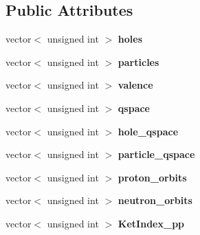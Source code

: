 \subsection*{Public Attributes}
\begin{DoxyCompactItemize}
\item 
\hypertarget{classModelSpace_a7fc062a55dd3c797742492ce81e32570}{vector$<$ unsigned int $>$ {\bfseries holes}}\label{classModelSpace_a7fc062a55dd3c797742492ce81e32570}

\item 
\hypertarget{classModelSpace_a1b0b3cbd99f4e1da7673ec98044d1214}{vector$<$ unsigned int $>$ {\bfseries particles}}\label{classModelSpace_a1b0b3cbd99f4e1da7673ec98044d1214}

\item 
\hypertarget{classModelSpace_a72f61e1534f212bc2b0a537686bfed87}{vector$<$ unsigned int $>$ {\bfseries valence}}\label{classModelSpace_a72f61e1534f212bc2b0a537686bfed87}

\item 
\hypertarget{classModelSpace_a5a2ab2d6d92ea40365dc33d94be29413}{vector$<$ unsigned int $>$ {\bfseries qspace}}\label{classModelSpace_a5a2ab2d6d92ea40365dc33d94be29413}

\item 
\hypertarget{classModelSpace_a8ccc8e1a69908f13f6d67bc6409ff1b5}{vector$<$ unsigned int $>$ {\bfseries hole\-\_\-qspace}}\label{classModelSpace_a8ccc8e1a69908f13f6d67bc6409ff1b5}

\item 
\hypertarget{classModelSpace_a58d67334ebf7bea162939fba0b5c042a}{vector$<$ unsigned int $>$ {\bfseries particle\-\_\-qspace}}\label{classModelSpace_a58d67334ebf7bea162939fba0b5c042a}

\item 
\hypertarget{classModelSpace_a43ea9304032a8e73882a66f507bebd9c}{vector$<$ unsigned int $>$ {\bfseries proton\-\_\-orbits}}\label{classModelSpace_a43ea9304032a8e73882a66f507bebd9c}

\item 
\hypertarget{classModelSpace_af62f9ad65605e52f6e26ce83d78ba576}{vector$<$ unsigned int $>$ {\bfseries neutron\-\_\-orbits}}\label{classModelSpace_af62f9ad65605e52f6e26ce83d78ba576}

\item 
\hypertarget{classModelSpace_a5a43308e9716926878f98ab194a9de6a}{vector$<$ unsigned int $>$ {\bfseries Ket\-Index\-\_\-pp}}\label{classModelSpace_a5a43308e9716926878f98ab194a9de6a}


\end{DoxyCompactItemize}
